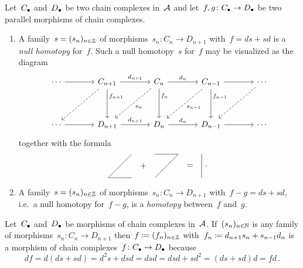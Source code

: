 \begin{remark*}
  Let~$C_\bullet$ and~$D_\bullet$ be two chain complexes in~$\mathcal{A}$ and let~$f, g \colon C_\bullet \to D_\bullet$ be two parallel morphisms of chain complexes.
  \begin{enumerate}
    \item
      A family~$s = (s_n)_{n \in \mathbb{Z}}$ of morphisms~$s_n \colon C_n \to D_{n+1}$ with~$f = ds + sd$ is a \emph{null homotopy} for~$f$.
      Such a null homotopy~$s$ for~$f$ may be visualized as the diagram
      \[
        \begin{tikzcd}[column sep =  large, row sep = huge]
            \dotsb
            \arrow{r}
          & C_{n+1}
            \arrow{r}[above]{d_{n+1}}
            \arrow{d}[right, near start]{f_{n+1}}
            \arrow[dashed]{dl}
          & C_n
            \arrow{r}[above]{d_n}
            \arrow{d}[right, near start]{f_n}
            \arrow[dashed]{dl}[below right]{s_n}
          & C_{n-1}
            \arrow{r}
            \arrow{d}[right, near start]{f_{n-1}}
            \arrow[dashed]{dl}[below right]{s_{n-1}}
          & \dotsb
            \arrow[dashed]{dl}
          \\
            \dotsb
            \arrow{r}
          & D_{n+1}
            \arrow{r}[above]{d_{n+1}}
          & D_n
            \arrow{r}[above]{d_n}
          & D_{n-1}
            \arrow{r}
          & \dotsb
        \end{tikzcd}
      \]
      together with the formula
      \[
          \begin{tikzpicture}
            \draw (1,1) -- (0,0)-- (1,0);
            \draw (1.5,0.5) node{$+$};
            \draw (2,1) -- (3,1) -- (2,0);
            \draw (3.5,0.5) node{$=$};
            \draw (4,1) -- (4,0);
            \draw (4.2,0.5) node {.};
          \end{tikzpicture}
      \]
    \item
      A family~$s = (s_n)_{n \in \mathbb{Z}}$ of morphisms~$s_n \colon C_n \to D_{n+1}$ with~$f-g = ds + sd$, i.e.\ a null homotopy for~$f-g$, is a \emph{homotopy} between~$f$ and~$g$.
  \end{enumerate}
\end{remark*}


\begin{remark}
  Let~$C_\bullet$ and~$D_\bullet$ be morphisms of chain complexes in~$\mathcal{A}$.
  If~$(s_n)_{n \in \mathbb{N}}$ is any family of morphisms~$s_n \colon C_n \to D_{n+1}$ then~$f \coloneqq (f_n)_{n \in \mathbb{Z}}$ with~$f_n \coloneqq d_{n+1} s_n + s_{n-1} d_n$ is a morphism of chain complexes~$f \colon C_\bullet \to D_\bullet$ because
  \[
      d{}f
    = d (ds + sd)
    = d^2 s + dsd
    = dsd
    = dsd + sd^2
    = (ds + sd) d
    = f d \,.
  \]
\end{remark}

